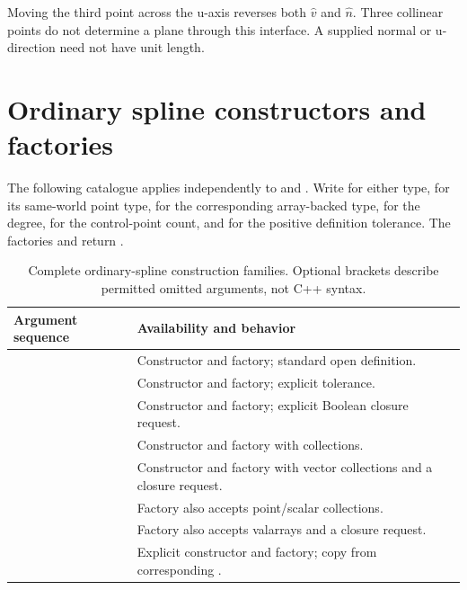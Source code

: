 Moving the third point across the u-axis reverses both $\widehat v$ and
$\widehat n$. Three collinear points do not determine a plane through this
interface. A supplied normal or u-direction need not have unit length.

\section{Ordinary spline constructors and factories}

The following catalogue applies independently to  and
. Write  for either type,
 for its same-world point type,  for the corresponding
array-backed type,  for the degree,  for the control-point
count, and  for the positive definition tolerance. The factories
 and  return
.

\begin{table}[htbp]
\centering
\caption{Complete ordinary-spline construction families. Optional brackets
describe permitted omitted arguments, not C++ syntax.}
\begin{tabularx}{\linewidth}{@{}p{.52\linewidth}Y@{}}
\toprule
Argument sequence & Availability and behavior \\
\midrule
{} & Constructor and factory; standard open definition. \\
 & Constructor and factory; explicit tolerance. \\
 & Constructor and factory; explicit Boolean closure request. \\
 & Constructor and factory with  collections. \\
 & Constructor and factory with vector collections and a closure request. \\
 & Factory also accepts point/scalar  collections. \\
 & Factory also accepts valarrays and a closure request. \\
 & Explicit constructor and factory; copy from corresponding . \\
\bottomrule
\end{tabularx}
\end{table}

